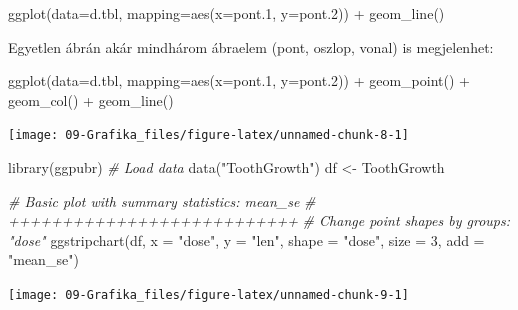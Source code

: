 \documentclass[
]{book}
\newenvironment{Shaded}{\begin{snugshade}}{\end{snugshade}}
\newcommand{\AttributeTok}[1]{\textcolor[rgb]{0.77,0.63,0.00}{#1}}
\newcommand{\CommentTok}[1]{\textcolor[rgb]{0.56,0.35,0.01}{\textit{#1}}}
\newcommand{\DecValTok}[1]{\textcolor[rgb]{0.00,0.00,0.81}{#1}}
\newcommand{\FloatTok}[1]{\textcolor[rgb]{0.00,0.00,0.81}{#1}}
\newcommand{\FunctionTok}[1]{\textcolor[rgb]{0.00,0.00,0.00}{#1}}
\newcommand{\NormalTok}[1]{#1}
\newcommand{\OtherTok}[1]{\textcolor[rgb]{0.56,0.35,0.01}{#1}}
\newcommand{\SpecialCharTok}[1]{\textcolor[rgb]{0.00,0.00,0.00}{#1}}
\newcommand{\StringTok}[1]{\textcolor[rgb]{0.31,0.60,0.02}{#1}}
\begin{document}
\begin{Shaded}
\begin{Highlighting}[]
\FunctionTok{ggplot}\NormalTok{(}\AttributeTok{data=}\NormalTok{d.tbl, }\AttributeTok{mapping=}\FunctionTok{aes}\NormalTok{(}\AttributeTok{x=}\NormalTok{pont}\FloatTok{.1}\NormalTok{, }\AttributeTok{y=}\NormalTok{pont}\FloatTok{.2}\NormalTok{)) }\SpecialCharTok{+} \FunctionTok{geom\_line}\NormalTok{()}
\end{Highlighting}
\end{Shaded}

Egyetlen ábrán akár mindhárom ábraelem (pont, oszlop, vonal) is megjelenhet:

\begin{Shaded}
\begin{Highlighting}[]
\FunctionTok{ggplot}\NormalTok{(}\AttributeTok{data=}\NormalTok{d.tbl, }\AttributeTok{mapping=}\FunctionTok{aes}\NormalTok{(}\AttributeTok{x=}\NormalTok{pont}\FloatTok{.1}\NormalTok{, }\AttributeTok{y=}\NormalTok{pont}\FloatTok{.2}\NormalTok{)) }\SpecialCharTok{+} \FunctionTok{geom\_point}\NormalTok{() }\SpecialCharTok{+} \FunctionTok{geom\_col}\NormalTok{() }\SpecialCharTok{+} \FunctionTok{geom\_line}\NormalTok{()}
\end{Highlighting}
\end{Shaded}

\begin{center}\texttt{[image: 09-Grafika\_files/figure-latex/unnamed-chunk-8-1]} \end{center}

\begin{Shaded}
\begin{Highlighting}[]
\FunctionTok{library}\NormalTok{(ggpubr)}
\CommentTok{\# Load data}
\FunctionTok{data}\NormalTok{(}\StringTok{"ToothGrowth"}\NormalTok{)}
\NormalTok{df }\OtherTok{\textless{}{-}}\NormalTok{ ToothGrowth}

\CommentTok{\# Basic plot with summary statistics: mean\_se}
\CommentTok{\# +++++++++++++++++++++++++++}
\CommentTok{\# Change point shapes by groups: "dose"}
\FunctionTok{ggstripchart}\NormalTok{(df, }\AttributeTok{x =} \StringTok{"dose"}\NormalTok{, }\AttributeTok{y =} \StringTok{"len"}\NormalTok{,}
   \AttributeTok{shape =} \StringTok{"dose"}\NormalTok{, }\AttributeTok{size =} \DecValTok{3}\NormalTok{,}
   \AttributeTok{add =} \StringTok{"mean\_se"}\NormalTok{)}
\end{Highlighting}
\end{Shaded}

\begin{center}\texttt{[image: 09-Grafika\_files/figure-latex/unnamed-chunk-9-1]} \end{center}
\end{document}
